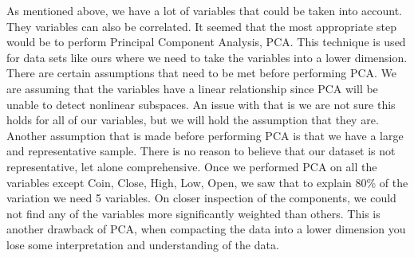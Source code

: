 \documentclass[12pt]{article}
\begin{document}
\indent As mentioned above, we have a lot of variables that could be taken into account. They variables can also be correlated. It seemed that the most appropriate step would be to perform Principal Component Analysis, PCA. This technique is used for data sets like ours where we need to take the variables into a lower dimension. There are certain assumptions that need to be met before performing PCA. We are assuming that the variables have a linear relationship since PCA will be unable to detect nonlinear subspaces. An issue with that is we are not sure this holds for all of our variables, but we will hold the assumption that they are. Another assumption that is made before performing PCA is that we have a large and representative sample. There is no reason to believe that our dataset is not representative, let alone comprehensive. Once we performed PCA on all the variables except Coin, Close, High, Low, Open, we saw that to explain 80\% of the variation we need 5 variables. On closer inspection of the components, we could not find any of the variables more significantly weighted than others. This is another drawback of PCA, when compacting the data into a lower dimension you lose some interpretation and understanding of the data.
\end{document}
